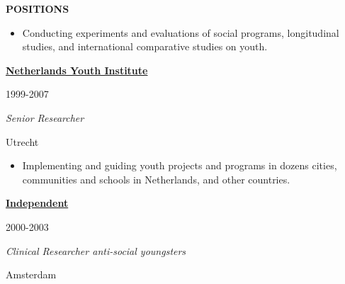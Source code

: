 \documentclass[
  16,
]{article}
\providecommand{\tightlist}{%
  \setlength{\itemsep}{0pt}\setlength{\parskip}{0pt}}\usepackage{longtable,booktabs,array}
\begin{document}
\begin{large}{\bf POSITIONS}
\begin{itemize}
\tightlist
\item
  Conducting experiments and evaluations of social programs,
  longitudinal studies, and international comparative studies on youth.
\end{itemize}

\vspace{7pt}

\begin{large}
  \begin{multicols}{2}
    \begin{flushleft}{\bf \href{https://www.nji.nl/}{Netherlands Youth Institute}}\end{flushleft}
    \begin{flushright}1999-2007\end{flushright}
  \end{multicols}
  \vspace{-0.17cm}
  \begin{multicols}{2}
    \begin{flushleft}\textit{Senior Researcher}\end{flushleft}
    \begin{flushright}Utrecht\end{flushright}\end
  {multicols}
\end{large}
\vspace{-0.16cm}

\begin{itemize}
\tightlist
\item
  Implementing and guiding youth projects and programs in dozens cities,
  communities and schools in Netherlands, and other countries.
\end{itemize}

\vspace{7pt}

\begin{large}
  \begin{multicols}{2}
    \begin{flushleft}{\bf \href{https://www.harriejonkman.nl}{Independent}}\end{flushleft}
    \begin{flushright}2000-2003\end{flushright}
  \end{multicols}
  \vspace{-0.17cm}
  \begin{multicols}{2}
    \begin{flushleft}\textit{Clinical Researcher anti-social youngsters}\end{flushleft}
    \begin{flushright}Amsterdam\end{flushright}\end
  {multicols}
\end{large}
\vspace{-0.16cm}


\end{large}
\end{document}
